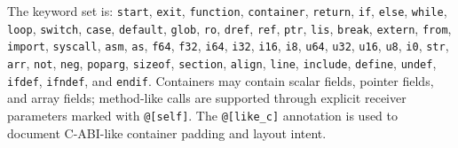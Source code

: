 \documentclass[10pt,twocolumn]{article}
\begin{document}
\par The keyword set is: \texttt{start}, \texttt{exit}, \texttt{function}, \texttt{container}, \texttt{return}, \texttt{if}, \texttt{else}, \texttt{while}, \texttt{loop}, \texttt{switch}, \texttt{case}, \texttt{default}, \texttt{glob}, \texttt{ro}, \texttt{dref}, \texttt{ref}, \texttt{ptr}, \texttt{lis}, \texttt{break}, \texttt{extern}, \texttt{from}, \texttt{import}, \texttt{syscall}, \texttt{asm}, \texttt{as}, \texttt{f64}, \texttt{f32}, \texttt{i64}, \texttt{i32}, \texttt{i16}, \texttt{i8}, \texttt{u64}, \texttt{u32}, \texttt{u16}, \texttt{u8}, \texttt{i0}, \texttt{str}, \texttt{arr}, \texttt{not}, \texttt{neg}, \texttt{poparg}, \texttt{sizeof}, \texttt{section}, \texttt{align}, \texttt{line}, \texttt{include}, \texttt{define}, \texttt{undef}, \texttt{ifdef}, \texttt{ifndef}, and \texttt{endif}. Containers may contain scalar fields, pointer fields, and array fields; method-like calls are supported through explicit receiver parameters marked with \texttt{@[self]}. The \texttt{@[like\_c]} annotation is used to document C-ABI-like container padding and layout intent.



\end{document}
